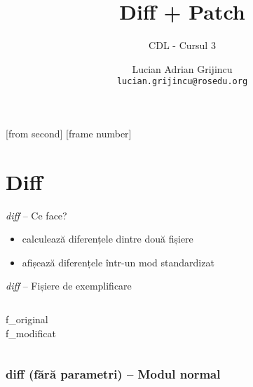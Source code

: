 \documentclass{beamer}
\title[Diff si Patch]{Diff + Patch}
\subtitle{CDL - Cursul 3}
\institute{ROSEdu}
\author[Q]{Lucian Adrian Grijincu \\ \texttt{lucian.grijincu@rosedu.org}}
\begin{document}
[from second]
[frame number]

\frame{\titlepage}

\frame{\tableofcontents}

\section{Diff}

\frame{\tableofcontents[currentsection]}

\begin{frame}{\textit{diff} – Ce face?}
\begin{itemize} %
  \item calculează diferențele dintre două fișiere
  \item afișează diferențele într-un mod standardizat
\end{itemize}
\end{frame}


\begin{frame}{\textit{diff} – Fișiere de exemplificare}
  \begin{columns}[t]
    \column{5cm}
    {\LARGE{f\_original}}\\
    {\tt{\small }}
    \column{5cm}
    {\LARGE{f\_modificat}}\\
    {\tt \small }
  \end{columns}
\end{frame}

\begin{frame}
  \frametitle{\textbf{diff} (fără parametri) – Modul normal}
  \tt 
\end{frame}
\end{document}
